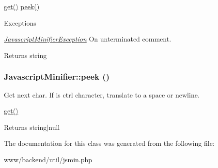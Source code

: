 \hyperlink{classJavascriptMinifier_ae7e2ae85b89dcd36f10c8298cc5c8749}{get()}  \hyperlink{classJavascriptMinifier_a7cb211bf16d3b5cc798d8fed55adff5e}{peek()} 
\begin{DoxyExceptions}{Exceptions}
\item[{\em \hyperlink{classJavascriptMinifierException}{JavascriptMinifierException}}]On unterminated comment. \end{DoxyExceptions}
\begin{DoxyReturn}{Returns}
string 
\end{DoxyReturn}
\hypertarget{classJavascriptMinifier_a7cb211bf16d3b5cc798d8fed55adff5e}{
\subsubsection[{peek}]{\setlength{\rightskip}{0pt plus 5cm}JavascriptMinifier::peek ()}}
\label{classJavascriptMinifier_a7cb211bf16d3b5cc798d8fed55adff5e}
Get next char. If is ctrl character, translate to a space or newline.

\hyperlink{classJavascriptMinifier_ae7e2ae85b89dcd36f10c8298cc5c8749}{get()} \begin{DoxyReturn}{Returns}
string$|$null 
\end{DoxyReturn}


The documentation for this class was generated from the following file:\begin{DoxyCompactItemize}
\item 
www/backend/util/jsmin.php\end{DoxyCompactItemize}
